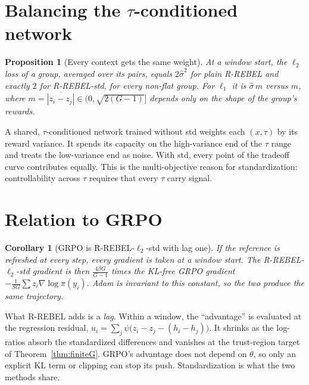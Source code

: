 \documentclass[11pt]{article}
\newtheorem{proposition}[theorem]{Proposition}
\newtheorem{corollary}[theorem]{Corollary}
\theoremstyle{definition}
\theoremstyle{remark}
\newcommand{\1}{\mathbb{1}}
\newcommand{\rr}{R-REBEL}
\newcommand{\rrs}{R-REBEL-std}
\begin{document}
\section{Balancing the \texorpdfstring{$\tau$}{tau}-conditioned network}\label{sec:balance}

\begin{proposition}[Every context gets the same weight]\label{prop:balance}
At a window start, the $\ell_2$ loss of a group, averaged over its pairs, equals
$2\hat\sigma^2$ for plain \rr{} and \emph{exactly} $2$ for \rrs{}, for every non-flat
group. For $\ell_1$ it is $\hat\sigma\,m$ versus $m$, where
$m=\overline{|z_i-z_j|}\in(0,\sqrt{2(G-1)}]$ depends only on the shape of the group's
rewards.
\end{proposition}

A shared, $\tau$-conditioned network trained without std weights each $(x,\tau)$ by
its reward variance. It spends its capacity on the high-variance end of the
$\tau$ range and treats the low-variance end as noise. With std, every point of the
tradeoff curve contributes equally. This is the multi-objective reason for
standardization: controllability across $\tau$ requires that every $\tau$ carry
signal.

\section{Relation to GRPO}\label{sec:grpo}

\begin{corollary}[GRPO is \rr{}-$\ell_2$-std with lag one]\label{cor:grpo}
If the reference is refreshed at every step, every gradient is taken at a window
start. The \rr{}-$\ell_2$-std gradient is then
$\frac{4\beta G}{G-1}$ times the KL-free GRPO gradient
$-\frac{1}{SG}\sum z_i\nabla\log\pi(y_i)$. Adam is invariant to this constant, so the two
produce the same trajectory.
\end{corollary}

What \rr{} adds is a \emph{lag}. Within a window, the ``advantage'' is evaluated at
the regression residual, $u_i=\sum_j\psi\bigl(z_i-z_j-(h_i-h_j)\bigr)$. It shrinks as
the log-ratios absorb the standardized differences and vanishes at the
trust-region target of Theorem~\ref{thm:finiteG}. GRPO's advantage does not depend
on $\theta$, so only an explicit KL term or clipping can stop its push.
Standardization is what the two methods share.
\end{document}
